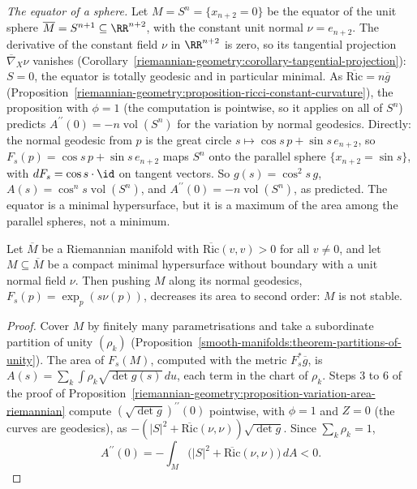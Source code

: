 \begin{example}\label{riemannian-geometry:example-equator-unstable}
\emph{The equator of a sphere.} Let $M = S^n = \{x_{n+2} = 0\}$ be the equator of the unit sphere $\overline{M} = S^{n+1} \subseteq \RR^{n+2}$, with the constant unit normal
$\nu = e_{n+2}$. The derivative of the constant field $\nu$ in $\RR^{n+2}$ is zero, so its tangential projection $\overline{\nabla}_X\nu$ vanishes
(Corollary~\ref{riemannian-geometry:corollary-tangential-projection}): $S = 0$, the equator is totally geodesic and in particular minimal. As
$\overline{\mathrm{Ric}} = n\overline{g}$ (Proposition~\ref{riemannian-geometry:proposition-ricci-constant-curvature}), the proposition with $\phi = 1$ (the computation is pointwise, so it applies on all of
$S^n$) predicts $A^{\prime\prime}(0) = -n\operatorname{vol}(S^n)$ for the variation by normal geodesics. Directly: the normal geodesic from $p$ is the great circle
$s \mapsto \cos s\,p + \sin s\,e_{n+2}$, so $F_s(p) = \cos s\,p + \sin s\,e_{n+2}$ maps $S^n$ onto the parallel sphere $\{x_{n+2} = \sin s\}$, with $dF_s = \cos s \cdot \id$ on tangent
vectors. So $g(s) = \cos^2s\,g$, $A(s) = \cos^ns\operatorname{vol}(S^n)$, and $A^{\prime\prime}(0) = -n\operatorname{vol}(S^n)$, as predicted. The equator is a minimal hypersurface, but it is a
maximum of the area among the parallel spheres, not a minimum.
\end{example}

\begin{corollary}\label{riemannian-geometry:corollary-ricci-unstable}
Let $\overline{M}$ be a Riemannian manifold with $\overline{\mathrm{Ric}}(v, v) > 0$ for all $v \neq 0$, and let $M \subseteq \overline{M}$ be a compact minimal hypersurface without boundary
with a unit normal field $\nu$. Then pushing $M$ along its normal geodesics, $F_s(p) = \exp_p(s\nu(p))$, decreases its area to second order: $M$ is not stable.
\end{corollary}

\begin{proof}
Cover $M$ by finitely many parametrisations and take a subordinate partition of unity $(\rho_k)$ (Proposition~\ref{smooth-manifolds:theorem-partitions-of-unity}). The area of
$F_s(M)$, computed with the metric $F_s^*\overline{g}$, is $A(s) = \sum_k\int\rho_k\sqrt{\det g(s)}\,du$, each term in the chart of $\rho_k$. Steps 3 to 6 of the proof of
Proposition~\ref{riemannian-geometry:proposition-variation-area-riemannian} compute $(\sqrt{\det g})^{\prime\prime}(0)$ pointwise, with $\phi = 1$ and $Z = 0$ (the curves are geodesics),
as $-(|S|^2 + \overline{\mathrm{Ric}}(\nu, \nu))\sqrt{\det g}$. Since $\sum_k\rho_k = 1$,
\[
A^{\prime\prime}(0) = -\int_M\bigl(|S|^2 + \overline{\mathrm{Ric}}(\nu, \nu)\bigr)\,dA < 0 .
\]
\end{proof}

